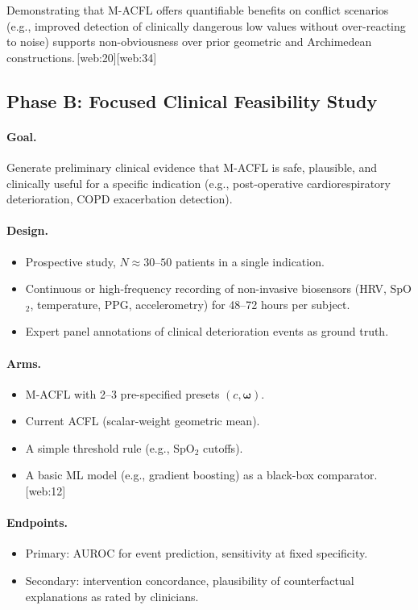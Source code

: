 \documentclass[11pt]{article}
\begin{document}
Demonstrating that M-ACFL offers quantifiable benefits on conflict scenarios (e.g., improved detection of clinically dangerous low values without over-reacting to noise) supports non-obviousness over prior geometric and Archimedean constructions.\,[web:20][web:34] 

\subsection{Phase B: Focused Clinical Feasibility Study}

\paragraph{Goal.}
Generate preliminary clinical evidence that M-ACFL is safe, plausible, and clinically useful for a specific indication (e.g., post-operative cardiorespiratory deterioration, COPD exacerbation detection).

\paragraph{Design.}
\begin{itemize}
  \item Prospective study, $N \approx 30$--$50$ patients in a single indication.
  \item Continuous or high-frequency recording of non-invasive biosensors (HRV, SpO$_2$, temperature, PPG, accelerometry) for 48--72 hours per subject.
  \item Expert panel annotations of clinical deterioration events as ground truth.
\end{itemize}

\paragraph{Arms.}
\begin{itemize}
  \item M-ACFL with 2--3 pre-specified presets $(c,\boldsymbol{\omega})$.
  \item Current ACFL (scalar-weight geometric mean).
  \item A simple threshold rule (e.g., SpO$_2$ cutoffs).
  \item A basic ML model (e.g., gradient boosting) as a black-box comparator.\,[web:12]
\end{itemize}

\paragraph{Endpoints.}
\begin{itemize}
  \item Primary: AUROC for event prediction, sensitivity at fixed specificity.
  \item Secondary: intervention concordance, plausibility of counterfactual explanations as rated by clinicians.
\end{itemize}
\end{document}
